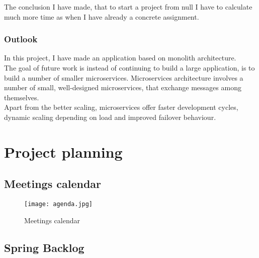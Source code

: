 \documentclass{scrartcl}
\begin{document}
The conclusion I have made, that to start a project from null I have to calculate much more time as when I have already a concrete assignment.
 

\subsubsection{Outlook}

In this project, I have made an application based on monolith architecture. \\
The goal of future work is instead of continuing to build a large application, is to build a number of smaller microservices. Microservices architecture involves a number of small, well-designed microservices, that exchange messages among themselves.\\
Apart from the better scaling, microservices offer faster development cycles, dynamic scaling depending on load and improved failover behaviour.\\




\newpage


\printbibliography[heading=bibintoc]

\pagebreak

\section{Project planning}
\subsection{Meetings calendar}

\begin{figure}[H]
\centering
\texttt{[image: agenda.jpg]}
\caption{Meetings calendar}
\label{calendar}
\end{figure}


\subsection{Spring Backlog}
\end{document}
